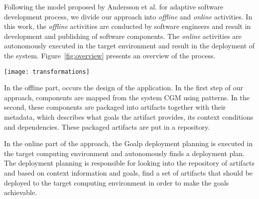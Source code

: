 \label{sec:proposal}



Following the model proposed by Andersson et al.\cite{andersson_software_2013} for adaptive software development process, we divide our approach into \emph{offline} and \emph{online} activities. In this work, the \emph{offline} activities are conducted by software engineers and result in development and publishing of software components. The \emph{online} activities are autonomously executed in the target environment and result in the deployment of the system. Figure~\ref{fig:overview} presents an overview of the process.

\begin{figure*}[!htb]
  \centering
  \texttt{[image: transformations]}
  \caption{Activities: (1) component mapping; (2) packaging; (3) deployment planning; (4) component binding}
\label{fig:overview}
\end{figure*}


In the offline part, occurs the design of the application. In the first step of our approach, components are mapped from the system CGM using patterns. In the second, these components are packaged into artifacts together with their metadata, which describes what goals the artifact provides, its context conditions and dependencies. These packaged artifacts are put in a repository.

In the online part of the approach, the Goalp deployment planning is executed in the target computing environment and autonomously finds a deployment plan.
The deployment planning is responsible for looking into the repository of artifacts and based on context information and goals, find a set of artifacts that should be deployed to the target computing environment in order to make the goals achievable.

